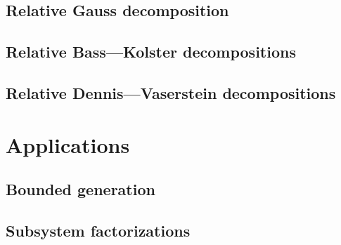 \documentclass[12pt]{amsart}
\theoremstyle{plain}
\numberwithin{equation}{section}
\numberwithin{lemma}{section}
\theoremstyle{definition}
\theoremstyle{remark}
\begin{document}
\subsection{Relative Gauss decomposition}\label{sec:gauss}

\subsection{Relative Bass---Kolster decompositions}\label{sec:bass-kolster}

\subsection{Relative Dennis---Vaserstein decompositions}\label{sec:dennis-vaserstein}


\section{Applications} \label{sec:applications}
\subsection{Bounded generation}\label{sec:boundgen}

\subsection{Subsystem factorizations}\label{sec:subsysfact}


\printbibliography
\end{document}
